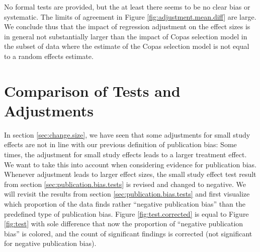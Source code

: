 No formal tests are provided, but the at least there seems to be no clear bias or systematic. The limits of agreement in Figure \ref{fig:adjustment.mean.diff} are large. We conclude thus that the impact of regression adjustment on the effect sizes is in general not substantially larger than the impact of Copas selection model in the subset of data where the estimate of the Copas selection model is not equal to a random effects estimate.  \\



\section{Comparison of Tests and Adjustments} \label{sec:comparison.tests.adjustment}


In section \ref{sec:change.size}, we have seen that some adjustments for small study effects are not in line with our previous definition of publication bias: Some times, the adjustment for small study effects leads to a larger treatment effect. We want to take this into account when considering evidence for publication bias. Whenever adjustment leads to larger effect sizes, the small study effect test result from section \ref{sec:publication.bias.tests} is revised and changed to negative. We will revisit the results from section \ref{sec:publication.bias.tests} and first visualize which proportion of the data finds rather ``negative publication bias'' than the predefined type of publication bias. Figure \ref{fig:test.corrected} is equal to Figure \ref{fig:test} with sole difference that now the proportion of ``negative publication bias'' is colored, and the count of significant findings is corrected (not significant for negative publication bias). \\

